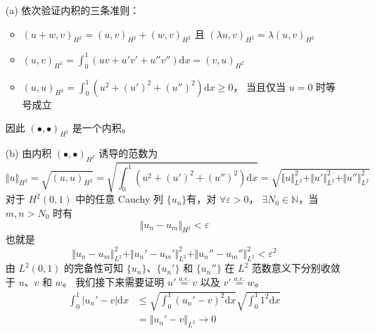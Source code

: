 \documentclass[a4paper]{article}
\begin{document}
\begin{enumerate}
    \item[(a)] 依次验证内积的三条准则：
            \begin{itemize}
                \item $(u+w,v)_{H^2}=(u,v)_{H^2}+(w,v)_{H^2}$ 且 $(\lambda u,v)_{H^2}=\lambda (u,v)_{H^2}$
                \item $(u,v)_{H^2}=\displaystyle\int_{0}^{1}(uv+u'v'+u''v'')\text{d}x=(v,u)_{H^2}$
                \item $(u,u)_{H^2}=\displaystyle\int_{0}^{1}\left(u^2+(u')^2+(u'')^2\right)\text{d}x\geq 0$，
                        当且仅当 $u=0$ 时等号成立
            \end{itemize}
            因此 $(\bullet, \bullet)_{H^2}$ 是一个内积。
    \item[(b)] 由内积 $(\bullet, \bullet)_{H^2}$ 诱导的范数为 
            \begin{equation}
                \Vert u\Vert_{H^2}=\sqrt{(u,u)_{H^2}}
                =\sqrt{\int_{0}^{1}\left(u^2+(u')^2+(u'')^2\right)\text{d}x}
                =\sqrt{\Vert u\Vert_{L^2}^2+\Vert u'\Vert_{L^2}^2+\Vert u''\Vert_{L^2}^2}
            \end{equation}
            对于 $H^2(0,1)$ 中的任意 Cauchy 列 
            $\{u_n\}$有，对 $\forall \varepsilon>0$，
            $\exists N_0 \in \mathbb{N}$，当 $m,n>N_0$ 时有
            \begin{equation}
                \Vert u_n-u_m\Vert_{H^2} < \varepsilon
            \end{equation}
            也就是
            \begin{equation}
                \Vert u_n-u_m\Vert_{L^2}^2+\Vert u_n'-u_m'\Vert_{L^2}^2+\Vert u_n''-u_m''\Vert_{L^2}^2 < \varepsilon^2
            \end{equation}
            由 $L^2(0,1)$ 的完备性可知 $\{u_n\}$、$\{u_n'\}$ 和 $\{u_n''\}$ 
            在 $L^2$ 范数意义下分别收敛于 $u$、$v$ 和 $w$。
            我们接下来需要证明 $u' \overset{a.e.}{=} v$ 以及 $v' \overset{a.e.}{=} w$。
            \begin{equation}
                \begin{aligned}
                    \int_{0}^{1}|u_n'-v|\text{d}x
                    &\leq \sqrt{\int_{0}^{1}(u_n'-v)^2\text{d}x}
                    \sqrt{\int_{0}^{1}1^2\text{d}x}\\
                    &=\Vert u_n'-v \Vert_{L^2} \rightarrow 0
                \end{aligned}

\end{equation}
\end{enumerate}
\end{document}
